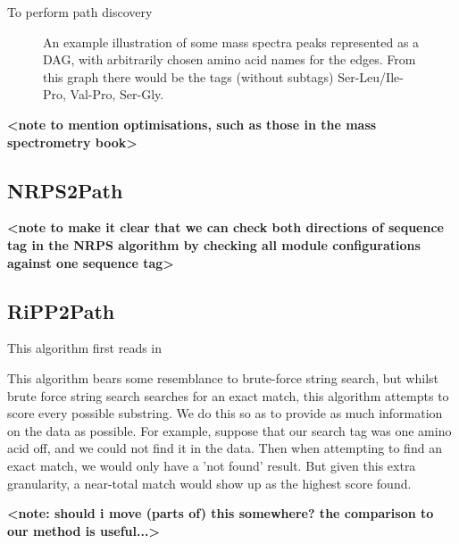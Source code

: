 \documentclass{l4proj}
\begin{document}
To perform path discovery

\begin{figure}
    \centering

    \caption{An example illustration of some mass spectra peaks represented as a DAG, with arbitrarily chosen amino acid names for the edges. From this 	    graph there would be the tags (without subtags) Ser-Leu/Ile-Pro, Val-Pro, Ser-Gly.
    }

    \label{fig:peak_graph}
\end{figure}

\textbf{<note to mention optimisations, such as those in the mass spectrometry book>}

\subsection{NRPS2Path}
\textbf{<note to make it clear that we can check both directions of sequence tag in the NRPS algorithm by checking all module configurations against one sequence tag>}

\subsection{RiPP2Path}

This algorithm first reads in 

This algorithm bears some resemblance to brute-force string search, but whilst brute force string search searches for an exact match, this algorithm attempts to score every possible substring. We do this so as to provide as much information on the data as possible. For example, suppose that our search tag was one amino acid off, and we could not find it in the data. Then when attempting to find an exact match, we would only have a 'not found' result. But given this extra granularity, a near-total match would show up as the highest score found. 

\textbf{<note: should i move (parts of) this somewhere? the comparison to our method is useful...>}
\end{document}
